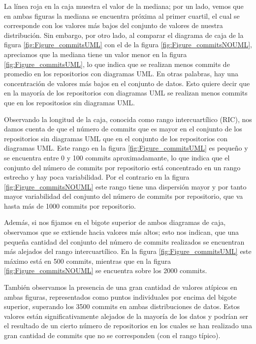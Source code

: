 \documentclass[a4paper, 12pt]{book}
\begin{document}
La línea roja en la caja muestra el valor de la mediana; por un lado, vemos que en ambas figuras la mediana se encuentra próxima al primer cuartil, el cual se corresponde con los valores más bajos del conjunto de valores de nuestra distribución. 
Sin embargo, por otro lado, al comparar el diagrama de caja de la figura \ref{fig:Figure_commitsUML} con el de la figura \ref{fig:Figure_commitsNOUML}, apreciamos que la mediana tiene un valor menor en la figura \ref{fig:Figure_commitsUML}, lo que indica que se realizan menos commits de promedio en los repositorios con diagramas UML. 
En otras palabras, hay una concentración de valores más bajos en el conjunto de datos. 
Esto quiere decir que en la mayoría de los repositorios con diagramas UML se realizan menos commits que en los repositosios sin diagramas UML.

 
Observando la longitud de la caja, conocida como rango intercuartílico (RIC), nos damos cuenta de que el número de commits que es mayor en el conjunto de los repositorios sin diagramas UML que en el conjunto de los repositorios con diagramas UML.
Este rango en la figura \ref{fig:Figure_commitsUML} es pequeño y se encuentra entre 0 y 100 commits aproximadamante, lo que indica que el conjunto del número de commits por repositorio está concentrado en un rango estrecho y hay poca variabilidad.
Por el contrario en la figura \ref{fig:Figure_commitsNOUML} este rango tiene una dispersión mayor y por tanto mayor variabilidad del conjunto del número de commits por repositorio, que va hasta más de 1000 commits por repositorio.


Además, si nos fijamos en el bigote superior de ambos diagramas de caja, observamos que se extiende hacia valores más altos; esto nos indican, que una pequeña cantidad del conjunto del número de commits realizados se encuentran más alejados del rango intercuartílico.
En la figura \ref{fig:Figure_commitsUML} este máximo está en 500 commits, mientras que en la figura \ref{fig:Figure_commitsNOUML} se encuentra sobre los 2000 commits.


También observamos la presencia de una gran cantidad de valores atípicos en ambas figuras, representados como puntos individuales por encima del bigote superior, superando los 3500 commits en ambas distribuciones de datos. 
Estos valores están significativamente alejados de la mayoría de los datos y podrían ser el resultado de un cierto número de repositorios en los cuales se han realizado una gran cantidad de commits que no se corresponden (con el rango típico). 
\end{document}
